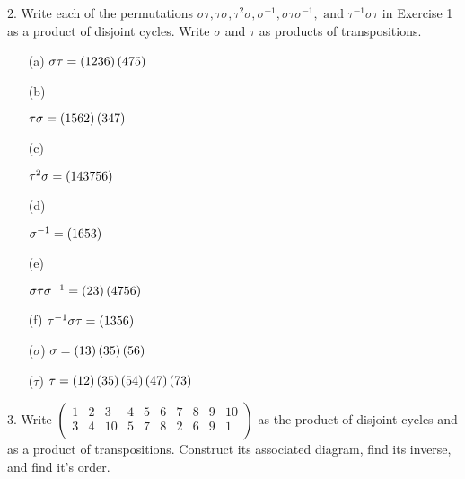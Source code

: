 \newpage
\begin{mdframed}[style=darkQuesion]
  2. Write each of the permutations $\sigma\tau, \tau\sigma, \tau^2\sigma,
    \sigma^{-1}, \sigma\tau\sigma^{-1}, \text{ and } \tau^{-1}\sigma\tau$ in
  Exercise 1 as a product of disjoint cycles. Write $\sigma$ and $\tau$ as
  products of transpositions.
\end{mdframed}

\begin{mdframed}[style=darkAnswer,frametitle={Joe Starr}]
  \begin{multicols}{2}
    \begin{itemize}
      \item [(a)]{
            $\sigma\tau=\left(1236\right)\left(475\right)$
            }
      \item [(b)]{
            $\tau\sigma=\left(1562\right)\left(347\right)$

            }
      \item [(c)]{
            $\tau^2\sigma=\left(143756\right)$

            }
      \item [(d)]{
            $\sigma^{-1}=\left(1653\right)$

            }
      \item [(e)]{
            $\sigma\tau\sigma^{-1}=\left(23\right)\left(4756\right)$

            }
      \item [(f)]{
            $\tau^{-1}\sigma\tau=\left(1356\right)$
            }
      \item [($\sigma$)]{
            $\sigma=\left(13\right)\left(35\right)\left(56\right)$
            }
      \item [($\tau$)]{
            $\tau=\left(12\right)\left(35\right)\left(54\right)\left(47\right)\left(73\right)$
            }
    \end{itemize}
  \end{multicols}
\end{mdframed}
\newpage
\begin{mdframed}[style=darkQuesion]
  3. Write
  $\begin{pmatrix}
      1 & 2 & 3  & 4 & 5 & 6 & 7 & 8 & 9 & 10 \\
      3 & 4 & 10 & 5 & 7 & 8 & 2 & 6 & 9 & 1  \\
    \end{pmatrix}$ as the product of disjoint cycles and as a product of
  transpositions. Construct its associated diagram, find its inverse, and find
  it's order.
\end{mdframed}

